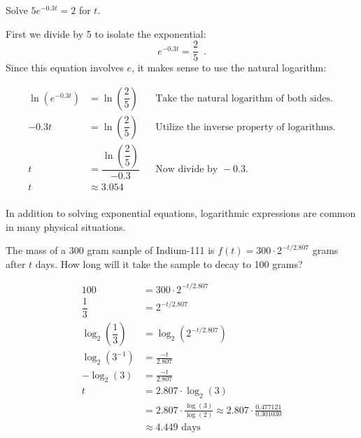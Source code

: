 \begin{example}
Solve $5e^{-0.3t}=2$ for $t$.

\begin{solution}  First we divide by 5 to isolate the exponential:
$$e^{-0.3t}=\frac{2}{5} \enspace .$$
Since this equation involves $e$, it makes sense to use the natural logarithm:

\begin{align*}
    \ln\left(e^{-0.3t}\right) &= \ln\left(\dfrac{2}{5}\right)& &\mbox{Take the natural logarithm of both sides.}\\
    -0.3t &= \ln\left(\dfrac{2}{5}\right)& &\mbox{Utilize the inverse property of logarithms.}\\
    t &= \dfrac{\ln\left(\dfrac{2}{5}\right)}{-0.3}&  &\mbox{Now divide by } -0.3.\\
    t &\approx 3.054& &\\
\end{align*}
\end{solution}\end{example}

In addition to solving exponential equations, logarithmic expressions are common in many physical situations.

\begin{example} The mass of a 300 gram sample of Indium-111 is $f(t) = 300\cdot 2^{-t/2.807}$ grams after $t$ days. How long will it take the sample to decay to 100 grams?

    \begin{solution} 
    \begin{align*}    
    100 &= 300\cdot 2^{-t/2.807}\\
      \dfrac{1}{3} &= 2^{-t/2.807} \\
    \log_2\left(\dfrac{1}{3}\right) &= \log_2(2^{-t/2.807}) \\
    \log_2(3^{-1}) &= \frac{-t}{2.807} \\
    -\log_2(3) &= \frac{-t}{2.807} \\
    t &= 2.807\cdot\log_2(3) \\
    &= 2.807\cdot\frac{\log(3)}{\log(2)} \approx 2.807\cdot\frac{0.477121}{0.301030}\\
    &\approx 4.449\text{ days}
    \end{align*}
\end{solution}\end{example}

